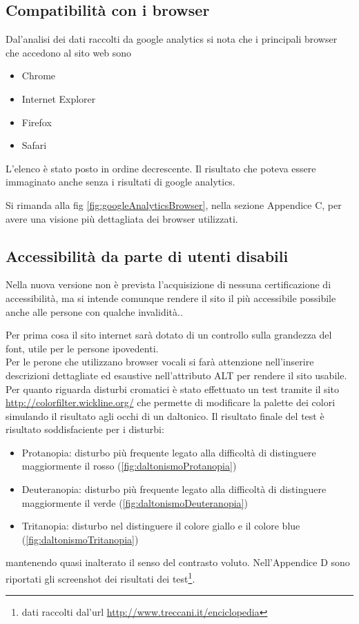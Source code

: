 \documentclass[a4paper,12pt,hidelinks]{report}
\begin{document}
  \subsection{Compatibilità con i browser}
    Dal'analisi dei dati raccolti da google analytics si nota che i principali browser che accedono al sito web sono
    \begin{itemize}
    \item Chrome
    \item Internet Explorer
    \item Firefox
    \item Safari
    \end{itemize}
    L'elenco è stato posto in ordine decrescente. Il risultato che poteva essere immaginato anche senza i risultati di google analytics.
    \par Si rimanda alla fig \ref{fig:googleAnalyticsBrowser}, nella sezione Appendice C, per avere una visione più dettagliata dei browser utilizzati.
  
  \subsection{Accessibilità da parte di utenti disabili}
    Nella nuova versione non è prevista l'acquisizione di nessuna certificazione di accessibilità, ma si intende comunque rendere il sito il più accessibile possibile anche alle
    persone con qualche invalidità..
    \par Per prima cosa il sito internet sarà dotato di un controllo sulla grandezza del font, utile per le persone ipovedenti. 
    \\ Per le perone che utilizzano browser vocali si farà attenzione nell'inserire descrizioni dettagliate ed esaustive nell'attributo ALT per rendere il sito usabile.
    \\ Per quanto riguarda disturbi cromatici è stato effettuato un test tramite il sito \url{http://colorfilter.wickline.org/} che permette di modificare la palette dei colori
    simulando il risultato agli occhi di un daltonico. Il risultato finale del test è risultato soddisfaciente per i disturbi:
    \begin{itemize}
      \item Protanopia: disturbo più frequente legato alla difficoltà di distinguere maggiormente il rosso (\ref{fig:daltonismoProtanopia})
      \item Deuteranopia: disturbo più frequente legato alla difficoltà di distinguere maggiormente il verde (\ref{fig:daltonismoDeuteranopia})
      \item Tritanopia: disturbo nel distinguere il colore giallo e il colore blue (\ref{fig:daltonismoTritanopia})
    \end{itemize}
    mantenendo quasi inalterato il senso del contrasto voluto. Nell'Appendice D sono riportati gli screenshot dei risultati dei test\footnote{dati raccolti dal'url \url{http://www.treccani.it/enciclopedia}}.
\end{document}
